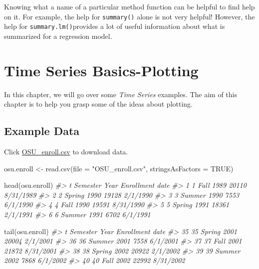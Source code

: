 \documentclass[
]{book}
\newenvironment{Shaded}{\begin{snugshade}}{\end{snugshade}}
\newcommand{\AttributeTok}[1]{\textcolor[rgb]{0.77,0.63,0.00}{#1}}
\newcommand{\CommentTok}[1]{\textcolor[rgb]{0.56,0.35,0.01}{\textit{#1}}}
\newcommand{\ConstantTok}[1]{\textcolor[rgb]{0.00,0.00,0.00}{#1}}
\newcommand{\FunctionTok}[1]{\textcolor[rgb]{0.00,0.00,0.00}{#1}}
\newcommand{\NormalTok}[1]{#1}
\newcommand{\OtherTok}[1]{\textcolor[rgb]{0.56,0.35,0.01}{#1}}
\newcommand{\StringTok}[1]{\textcolor[rgb]{0.31,0.60,0.02}{#1}}
\begin{document}
Knowing what a name of a particular method function can be helpful to find help on it. For example, the help for \texttt{summary()} alone is not very helpful! However, the help for \texttt{summary.lm()}provides a lot of useful information about what is summarized for a regression model.

\hypertarget{time-series-basics-plotting}{%
\chapter{Time Series Basics-Plotting}\label{time-series-basics-plotting}}

In this chapter, we will go over some \emph{Time Series} examples.
The aim of this chapter is to help you grasp some of the ideas about plotting.

\hypertarget{example-data}{%
\section{Example Data}\label{example-data}}

Click \href{http://www.chrisbilder.com/stat878/sections/2/OSU_enroll.csv}{OSU\_enroll.csv} to download data.

\begin{Shaded}
\begin{Highlighting}[]
\NormalTok{osu.enroll }\OtherTok{\textless{}{-}} \FunctionTok{read.csv}\NormalTok{(}\AttributeTok{file =} \StringTok{"OSU\_enroll.csv"}\NormalTok{, }
    \AttributeTok{stringsAsFactors =} \ConstantTok{TRUE}\NormalTok{)}
\end{Highlighting}
\end{Shaded}

\begin{Shaded}
\begin{Highlighting}[]
\FunctionTok{head}\NormalTok{(osu.enroll)}
\CommentTok{\#\textgreater{}   t Semester Year Enrollment      date}
\CommentTok{\#\textgreater{} 1 1     Fall 1989      20110 8/31/1989}
\CommentTok{\#\textgreater{} 2 2   Spring 1990      19128  2/1/1990}
\CommentTok{\#\textgreater{} 3 3   Summer 1990       7553  6/1/1990}
\CommentTok{\#\textgreater{} 4 4     Fall 1990      19591 8/31/1990}
\CommentTok{\#\textgreater{} 5 5   Spring 1991      18361  2/1/1991}
\CommentTok{\#\textgreater{} 6 6   Summer 1991       6702  6/1/1991}
\end{Highlighting}
\end{Shaded}

\begin{Shaded}
\begin{Highlighting}[]
\FunctionTok{tail}\NormalTok{(osu.enroll)}
\CommentTok{\#\textgreater{}     t Semester Year Enrollment      date}
\CommentTok{\#\textgreater{} 35 35   Spring 2001      20004  2/1/2001}
\CommentTok{\#\textgreater{} 36 36   Summer 2001       7558  6/1/2001}
\CommentTok{\#\textgreater{} 37 37     Fall 2001      21872 8/31/2001}
\CommentTok{\#\textgreater{} 38 38   Spring 2002      20922  2/1/2002}
\CommentTok{\#\textgreater{} 39 39   Summer 2002       7868  6/1/2002}
\CommentTok{\#\textgreater{} 40 40     Fall 2002      22992 8/31/2002}
\end{Highlighting}
\end{Shaded}
\end{document}

